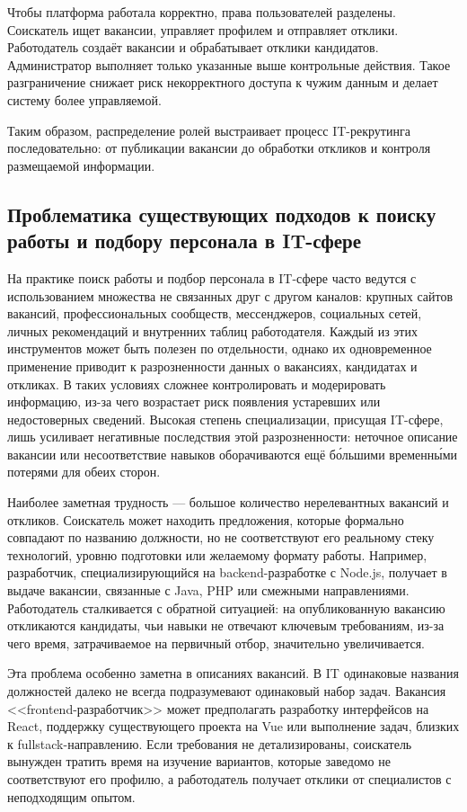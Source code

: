 Чтобы платформа работала корректно, права пользователей разделены. Соискатель ищет вакансии, управляет профилем и отправляет отклики. Работодатель создаёт вакансии и обрабатывает отклики кандидатов. Администратор выполняет только указанные выше контрольные действия. Такое разграничение снижает риск некорректного доступа к чужим данным и делает систему более управляемой.

Таким образом, распределение ролей выстраивает процесс IT-рекрутинга последовательно: от публикации вакансии до обработки откликов и контроля размещаемой информации.

\subsection{Проблематика существующих подходов к поиску работы и подбору персонала в IT-сфере}

На практике поиск работы и подбор персонала в IT-сфере часто ведутся с использованием множества не связанных друг с другом каналов: крупных сайтов вакансий, профессиональных сообществ, мессенджеров, социальных сетей, личных рекомендаций и внутренних таблиц работодателя. Каждый из этих инструментов может быть полезен по отдельности, однако их одновременное применение приводит к разрозненности данных о вакансиях, кандидатах и откликах. В таких условиях сложнее контролировать и модерировать информацию, из-за чего возрастает риск появления устаревших или недостоверных сведений. Высокая степень специализации, присущая IT-сфере, лишь усиливает негативные последствия этой разрозненности: неточное описание вакансии или несоответствие навыков оборачиваются ещё бо́льшими временны́ми потерями для обеих сторон.

Наиболее заметная трудность --- большое количество нерелевантных вакансий и откликов. Соискатель может находить предложения, которые формально совпадают по названию должности, но не соответствуют его реальному стеку технологий, уровню подготовки или желаемому формату работы. Например, разработчик, специализирующийся на backend-разработке с Node.js, получает в выдаче вакансии, связанные с Java, PHP или смежными направлениями. Работодатель сталкивается с обратной ситуацией: на опубликованную вакансию откликаются кандидаты, чьи навыки не отвечают ключевым требованиям, из-за чего время, затрачиваемое на первичный отбор, значительно увеличивается.

Эта проблема особенно заметна в описаниях вакансий. В IT одинаковые названия должностей далеко не всегда подразумевают одинаковый набор задач. Вакансия <<frontend-разработчик>> может предполагать разработку интерфейсов на React, поддержку существующего проекта на Vue или выполнение задач, близких к fullstack-направлению. Если требования не детализированы, соискатель вынужден тратить время на изучение вариантов, которые заведомо не соответствуют его профилю, а работодатель получает отклики от специалистов с неподходящим опытом.


